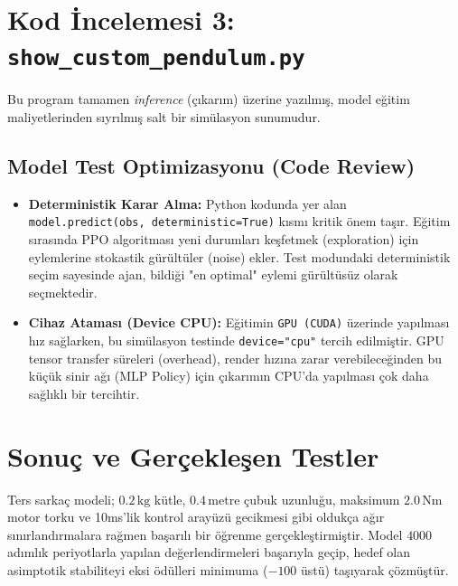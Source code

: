 \documentclass[12pt,a4paper]{article}
\begin{document}
\newpage
\section{Kod İncelemesi 3: \texttt{show\_custom\_pendulum.py}}
Bu program tamamen \textit{inference} (çıkarım) üzerine yazılmış, model eğitim maliyetlerinden sıyrılmış salt bir simülasyon sunumudur.

\subsection{Model Test Optimizasyonu (Code Review)}
\begin{itemize}
    \item \textbf{Deterministik Karar Alma:} Python kodunda yer alan \texttt{model.predict(obs, deterministic=True)} kısmı kritik önem taşır. Eğitim sırasında PPO algoritması yeni durumları keşfetmek (exploration) için eylemlerine stokastik gürültüler (noise) ekler. Test modundaki deterministik seçim sayesinde ajan, bildiği "en optimal" eylemi gürültüsüz olarak seçmektedir.
    \item \textbf{Cihaz Ataması (Device CPU):} Eğitimin \texttt{GPU (CUDA)} üzerinde yapılması hız sağlarken, bu simülasyon testinde \texttt{device="cpu"} tercih edilmiştir. GPU tensor transfer süreleri (overhead), render hızına zarar verebileceğinden bu küçük sinir ağı (MLP Policy) için çıkarımın CPU'da yapılması çok daha sağlıklı bir tercihtir.
\end{itemize}

\section{Sonuç ve Gerçekleşen Testler}
Ters sarkaç modeli; $0.2 \, \text{kg}$ kütle, $0.4 \, \text{metre}$ çubuk uzunluğu, maksimum $2.0 \, \text{Nm}$ motor torku ve 10ms'lik kontrol arayüzü gecikmesi gibi oldukça ağır sınırlandırmalara rağmen başarılı bir öğrenme gerçekleştirmiştir. Model $4000$ adımlık periyotlarla yapılan değerlendirmeleri başarıyla geçip, hedef olan asimptotik stabiliteyi eksi ödülleri minimuma ($-100$ üstü) taşıyarak çözmüştür.
\end{document}
